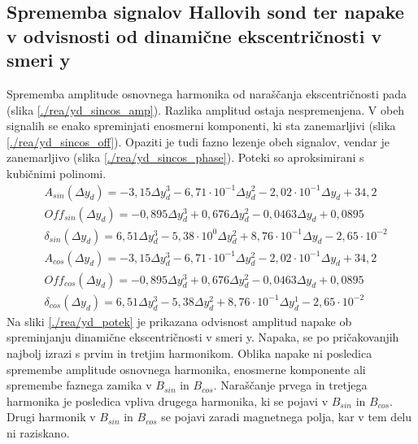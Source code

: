 \subsection{Sprememba signalov Hallovih sond ter napake v odvisnosti od dinamične ekscentričnosti v smeri y}
Sprememba amplitude osnovnega harmonika od naraščanja ekscentričnosti pada (slika \ref{./rea/yd_sincos_amp}). Razlika amplitud ostaja nespremenjena. V obeh signalih se enako spreminjati enosmerni komponenti, ki sta zanemarljivi (slika \ref{./rea/yd_sincos_off}). Opaziti je tudi fazno lezenje obeh signalov, vendar je zanemarljivo (slika \ref{./rea/yd_sincos_phase}).  Poteki so aproksimirani s kubičnimi polinomi.
\begin{eqnarray}
&A_{sin} (\Delta y_d) = -3,15            \Delta y_d^3-6,71\cdot 10^{-1}\Delta y_d^2-2,02\cdot 10^{-1}\Delta y_d+34,2                \\     
&Off_{sin} (\Delta y_d) = -0,895\Delta y_d^3+0,676\Delta y_d^2-0,0463\Delta y_d+0,0895 \\ 
&\delta_{sin} (\Delta y_d) = 6,51            \Delta y_d^3-5,38\cdot 10^{0}\Delta y_d^2+8,76\cdot 10^{-1}\Delta y_d-2,65\cdot 10^{-2}            \\
&A_{cos} (\Delta y_d) = -3,15            \Delta y_d^3-6,71\cdot 10^{-1}\Delta y_d^2-2,02\cdot 10^{-1}\Delta y_d+34,2                \\     
&Off_{cos} (\Delta y_d) = -0,895\Delta y_d^3+0,676\Delta y_d^2-0,0463\Delta y_d+0,0895 \\ 
&\delta_{cos} (\Delta y_d) = 6,51            \Delta y_d^3-5,38\Delta y_d^2+8,76\cdot 10^{-1}\Delta y_d^1-2,65\cdot 10^{-2}
\end{eqnarray}
Na sliki \ref{./rea/yd_potek} je prikazana odvisnost amplitud napake ob spreminjanju dinamične ekscentričnosti v smeri y. Napaka, se po pričakovanjih najbolj izrazi s prvim in tretjim harmonikom. Oblika napake ni posledica spremembe amplitude osnovnega harmonika, enosmerne komponente ali spremembe faznega zamika v $B_{sin}$ in $B_{cos}$. Naraščanje prvega in tretjega harmonika je posledica vpliva drugega harmonika, ki se pojavi v $B_{sin}$ in $B_{cos}$. Drugi harmonik v $B_{sin}$ in $B_{cos}$ se pojavi zaradi magnetnega polja, kar v tem delu ni raziskano.
